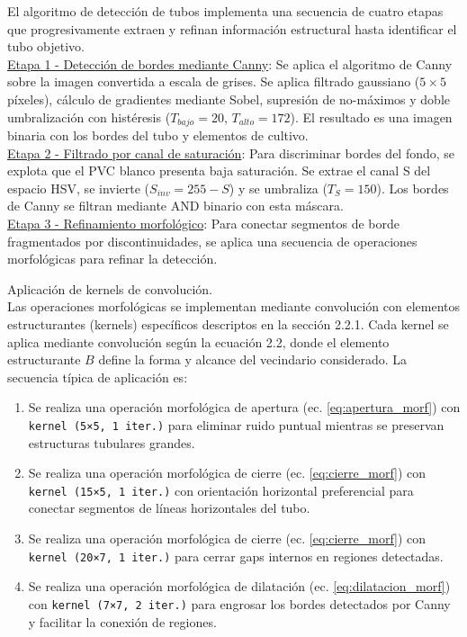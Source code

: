 El algoritmo de detección de tubos implementa una secuencia de cuatro etapas que progresivamente extraen y refinan información estructural hasta identificar el tubo objetivo.\\

\underline{Etapa 1 - Detección de bordes mediante Canny}: Se aplica el algoritmo de Canny sobre la imagen convertida a escala de grises. Se aplica filtrado gaussiano ($5 \times 5$ píxeles), cálculo de gradientes mediante Sobel, supresión de no-máximos y doble umbralización con histéresis ($T_{bajo} = 20$, $T_{alto} = 172$). El resultado es una imagen binaria con los bordes del tubo y elementos de cultivo.\\

\underline{Etapa 2 - Filtrado por canal de saturación}: Para discriminar bordes del fondo, se explota que el PVC blanco presenta baja saturación. Se extrae el canal S del espacio HSV, se invierte ($S_{inv} = 255 - S$) y se umbraliza ($T_S = 150$). Los bordes de Canny se filtran mediante AND binario con esta máscara.\\

\underline{Etapa 3 - Refinamiento morfológico}: Para conectar segmentos de borde fragmentados por discontinuidades, se aplica una secuencia de operaciones morfológicas para refinar la detección.

Aplicación de kernels de convolución.\\
\noindent
Las operaciones morfológicas se implementan mediante convolución con elementos estructurantes (kernels) específicos descriptos en la sección 2.2.1. Cada kernel se aplica mediante convolución según la ecuación 2.2, donde el elemento estructurante $B$ define la forma y alcance del vecindario considerado. La secuencia típica de aplicación es:

\begin{enumerate}
    \item Se realiza una operación morfológica de apertura (ec. \ref{eq:apertura_morf}) con \texttt{kernel (5×5, 1 iter.)} para eliminar ruido puntual mientras se preservan estructuras tubulares grandes.
    \item Se realiza una operación morfológica de cierre (ec. \ref{eq:cierre_morf}) con \texttt{kernel (15×5, 1 iter.)} con orientación horizontal preferencial para conectar segmentos de líneas horizontales del tubo.
    \item Se realiza una operación morfológica de cierre (ec. \ref{eq:cierre_morf}) con \texttt{kernel (20×7, 1 iter.)} para cerrar gaps internos en regiones detectadas.
    \item Se realiza una operación morfológica de dilatación (ec. \ref{eq:dilatacion_morf}) con \texttt{kernel (7×7, 2 iter.)} para engrosar los bordes detectados por Canny y facilitar la conexión de regiones.
\end{enumerate}


